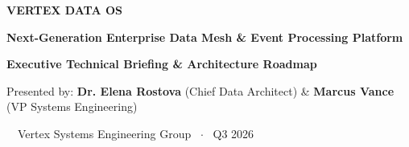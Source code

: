 \documentclass[landscape]{slides}
\begin{document}
\begin{slide}
\begin{center}
  \vspace*{0.5em}
  \begin{tcolorbox}[colback=NavyDark,colframe=TealAccent,arc=6pt,boxrule=2pt,width=0.95\textwidth]
    \centering
    \vspace{0.6em}
    {\Huge\bfseries\color{white} VERTEX DATA OS}\par\vspace{0.4em}
    {\large\color{CoralAccent}\bfseries Next-Generation Enterprise Data Mesh \& Event Processing Platform}\par\vspace{0.2em}
    \vspace{0.4em}
  \end{tcolorbox}
  
  \vspace{1.2em}
  
  \begin{tcolorbox}[colback=CardBg,colframe=BorderGray,arc=4pt,boxrule=1pt,width=0.95\textwidth]
    \centering
    \vspace{0.3em}
    {\large\color{NavyDark}\bfseries Executive Technical Briefing \& Architecture Roadmap}\par\vspace{0.5em}
    {\color{TextDark}\small Presented by: \textbf{Dr. Elena Rostova} (Chief Data Architect) \& \textbf{Marcus Vance} (VP Systems Engineering)}\par\vspace{0.2em}
    {\color{TealAccent}\small \faServer~~Vertex Systems Engineering Group ~$\cdot$~ Q3 2026}
    \vspace{0.3em}
  \end{tcolorbox}
\end{center}
\end{slide}
\end{document}
